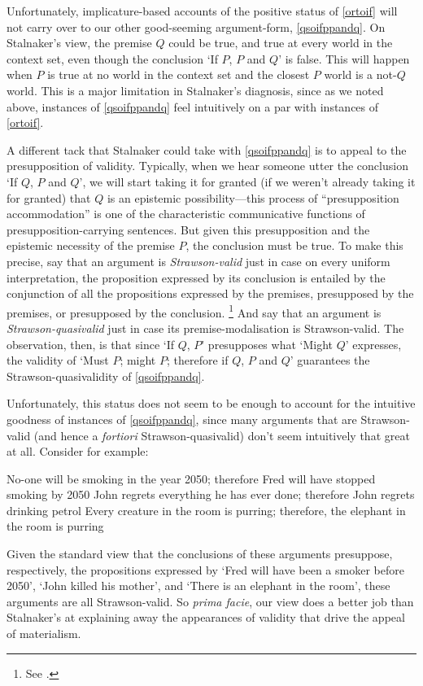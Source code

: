 \documentclass[If.tex]{subfiles}
\begin{document}
Unfortunately, implicature-based accounts of the positive status of \ref{ortoif} will not carry over to our other good-seeming argument-form, \ref{qsoifppandq}.  On Stalnaker's view, the premise $Q$ could be true, and true at every world in the context set, even though the conclusion ‘If $P$, $P$ and $Q$’ is false.  This will happen when $P$ is true at no world in the context set and the closest $P$ world is a not-$Q$ world.  This is a major limitation in Stalnaker's diagnosis, since as we noted above, instances of \ref{qsoifppandq} feel intuitively on a par with instances of \ref{ortoif}.  

A different tack that Stalnaker could take with \ref{qsoifppandq} is to appeal to the presupposition of validity.  Typically, when we hear someone utter the conclusion ‘If $Q$, $P$ and $Q$’, we will start taking it for granted (if we weren't already taking it for granted) that $Q$ is an epistemic possibility---this process of “presupposition accommodation” is one of the characteristic communicative functions of presupposition-carrying sentences.  But given this presupposition and the epistemic necessity of the premise $P$, the conclusion must be true.  To make this precise, say that an argument is \emph{Strawson-valid} just in case on every uniform interpretation, the proposition expressed by its conclusion is entailed by the conjunction of all the propositions expressed by the premises, presupposed by the premises, or presupposed by the conclusion.%
\footnote{See \cite{vonFintelNLSECD}.}  
And say that an argument is \emph{Strawson-quasivalid} just in case its premise-modalisation is Strawson-valid.  The observation, then, is that since ‘If $Q$, $P$’ presupposes what ‘Might $Q$’ expresses, the validity of ‘Must $P$; might $P$; therefore if $Q$, $P$ and $Q$’ guarantees the Strawson-quasivalidity of \ref{qsoifppandq}.  

Unfortunately, this status does not seem to be enough to account for the intuitive goodness of instances of \ref{qsoifppandq}, since many arguments that are Strawson-valid (and hence a \emph{fortiori} Strawson-quasivalid) don't seem intuitively that great at all.  Consider for example:
\begin{prop}
	\nitem 
	No-one will be smoking in the year 2050; therefore Fred will have stopped smoking by 2050
	\nitem 
	John regrets everything he has ever done; therefore John regrets drinking petrol
	\nitem 
	Every creature in the room is purring; therefore, the elephant in the room is purring
\end{prop}
Given the standard view that the conclusions of these arguments presuppose, respectively, the propositions expressed by ‘Fred will have been a smoker before 2050’, ‘John killed his mother’, and ‘There is an elephant in the room’, these arguments are all Strawson-valid.  So \emph{prima facie}, our view does a better job than Stalnaker's at explaining away the appearances of validity that drive the appeal of materialism.
\end{document}
